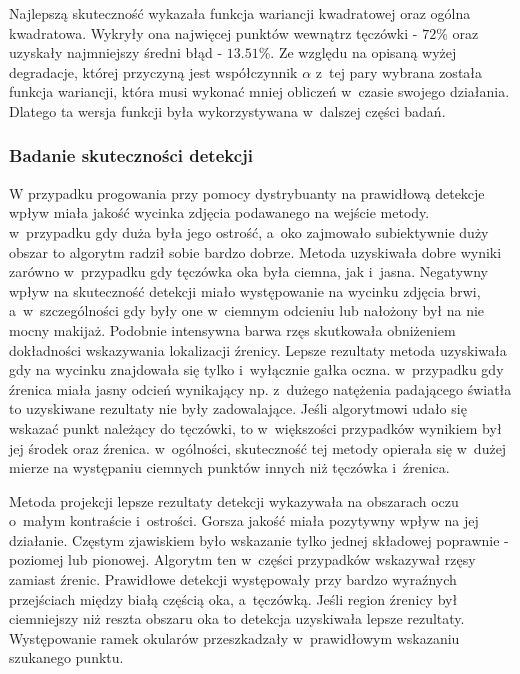 

Najlepszą skuteczność wykazała funkcja wariancji kwadratowej oraz ogólna kwadratowa. Wykryły ona najwięcej punktów wewnątrz tęczówki - $72\%$ oraz uzyskały najmniejszy średni błąd - $13.51\%$. Ze względu na opisaną wyżej degradacje, której przyczyną jest współczynnik $\alpha$ z~tej pary wybrana została funkcja wariancji, która musi wykonać mniej obliczeń w~czasie swojego działania. Dlatego ta wersja funkcji była wykorzystywana w~dalszej części badań.

\subsubsection{Badanie skuteczności detekcji}









W przypadku progowania przy pomocy dystrybuanty na prawidłową detekcje wpływ miała jakość wycinka zdjęcia podawanego na wejście metody. w~przypadku gdy duża była jego ostrość, a~oko zajmowało subiektywnie duży obszar to algorytm radził sobie bardzo dobrze. Metoda uzyskiwała dobre wyniki zarówno w~przypadku gdy tęczówka oka była ciemna, jak i~jasna. Negatywny wpływ na skuteczność detekcji miało występowanie na wycinku zdjęcia brwi, a~w~szczególności gdy były one w~ciemnym odcieniu lub nałożony był na nie mocny makijaż. Podobnie intensywna barwa rzęs skutkowała obniżeniem dokładności wskazywania lokalizacji źrenicy. Lepsze rezultaty metoda uzyskiwała gdy na wycinku znajdowała się tylko i~wyłącznie gałka oczna. w~przypadku gdy źrenica miała jasny odcień wynikający np. z~dużego natężenia padającego światła to uzyskiwane rezultaty nie były zadowalające. Jeśli algorytmowi udało się wskazać punkt należący do tęczówki, to w~większości przypadków wynikiem był jej środek oraz źrenica. w~ogólności, skuteczność tej metody opierała się w~dużej mierze na występaniu ciemnych punktów innych niż tęczówka i~źrenica.

\par

Metoda projekcji lepsze rezultaty detekcji wykazywała na obszarach oczu o~małym kontraście i~ostrości. Gorsza jakość miała pozytywny wpływ na jej działanie. Częstym zjawiskiem było wskazanie tylko jednej składowej poprawnie - poziomej lub pionowej. Algorytm ten w~części przypadków wskazywał rzęsy zamiast źrenic. Prawidłowe detekcji występowały przy bardzo wyraźnych przejściach między białą częścią oka, a~tęczówką. Jeśli region źrenicy był ciemniejszy niż reszta obszaru oka to detekcja uzyskiwała lepsze rezultaty. Występowanie ramek okularów przeszkadzały w~prawidłowym wskazaniu szukanego punktu.

